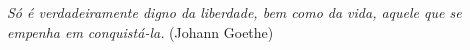 \renewcommand{\epigraphname}{EPÍGRAFE}

\begin{epigrafe}

\textit{Só é verdadeiramente digno da liberdade, bem como da vida, aquele que se empenha em conquistá-la.}
\hfill(Johann Goethe)

\end{epigrafe}
